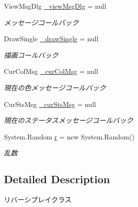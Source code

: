 \begin{DoxyCompactItemize}
View\+Msg\+Dlg \hyperlink{class_reversi_wpf_1_1_reversi_play_ab70140e09106b7e82b8959af3360de39}{\+\_\+view\+Msg\+Dlg} = null
\begin{DoxyCompactList}\small\item\em メッセージコールバック \end{DoxyCompactList}\item 
\mbox{\label{class_reversi_wpf_1_1_reversi_play_a915635a7da079933b0c3f4a7799421ae}} 
Draw\+Single \hyperlink{class_reversi_wpf_1_1_reversi_play_a915635a7da079933b0c3f4a7799421ae}{\+\_\+draw\+Single} = null
\begin{DoxyCompactList}\small\item\em 描画コールバック \end{DoxyCompactList}\item 
\mbox{\label{class_reversi_wpf_1_1_reversi_play_a69f1071d4e5e1a619b1d7dc4b5e4120f}} 
Cur\+Col\+Msg \hyperlink{class_reversi_wpf_1_1_reversi_play_a69f1071d4e5e1a619b1d7dc4b5e4120f}{\+\_\+cur\+Col\+Msg} = null
\begin{DoxyCompactList}\small\item\em 現在の色メッセージコールバック \end{DoxyCompactList}\item 
\mbox{\label{class_reversi_wpf_1_1_reversi_play_a7e31369a7d8d93b09a7a86d58b3c0502}} 
Cur\+Sts\+Msg \hyperlink{class_reversi_wpf_1_1_reversi_play_a7e31369a7d8d93b09a7a86d58b3c0502}{\+\_\+cur\+Sts\+Msg} = null
\begin{DoxyCompactList}\small\item\em 現在のステータスメッセージコールバック \end{DoxyCompactList}\item 
\mbox{\label{class_reversi_wpf_1_1_reversi_play_a3ee3805939fa7cbdedc950ed54891216}} 
System.\+Random \hyperlink{class_reversi_wpf_1_1_reversi_play_a3ee3805939fa7cbdedc950ed54891216}{r} = new System.\+Random()
\begin{DoxyCompactList}\small\item\em 乱数 \end{DoxyCompactList}\end{DoxyCompactItemize}


\subsection{Detailed Description}
リバーシプレイクラス 


